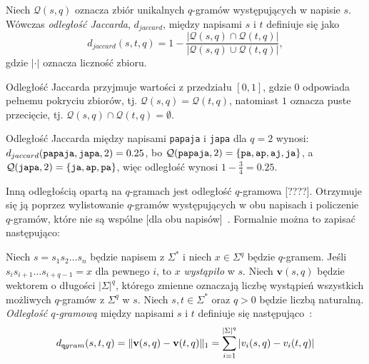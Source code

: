 \documentclass{praca1}
\DeclarePairedDelimiter{\norm}{\lVert}{\rVert}
\begin{document}
\begin{definition}
Niech $\mathcal{Q}(s,q)$ oznacza zbiór unikalnych $q$-gramów występujących w napisie $s$. Wówczas \emph{odległość Jaccarda}, $d_{jaccard}$, między napisami $s$ i $t$ definiuje się jako
\begin{equation*}
d_{jaccard}(s,t,q) = 1 - \frac{|\mathcal{Q}(s,q) \cap \mathcal{Q}(t,q)|}{|\mathcal{Q}(s,q) \cup \mathcal{Q}(t,q)|},
\end{equation*}
gdzie $|\cdot|$ oznacza liczność zbioru.
\end{definition} 

Odległość Jaccarda przyjmuje wartości z przedziału $[0,1]$, gdzie $0$ odpowiada pełnemu pokryciu zbiorów, tj. $\mathcal{Q}(s,q) = \mathcal{Q}(t,q)$, natomiast $1$ oznacza puste przecięcie, tj. $\mathcal{Q}(s,q) \cap \mathcal{Q}(t,q) = \emptyset$.

\begin{example}
Odległość Jaccarda między napisami \verb|papaja| i \verb|japa| dla $q = 2$ wynosi: $d_{jaccard}(\verb|papaja|, \verb|japa|, 2)  = 0.25$, bo $\mathcal{Q}(\verb|papaja|, 2) = \{\verb|pa|, \verb|ap|, \verb|aj|, \verb|ja|\}$, a $\mathcal{Q}(\verb|japa|, 2) = \{\verb|ja|, \verb|ap|, \verb|pa|\}$, więc odległość wynosi $1 - \frac{3}{4} = 0.25$.
\end{example}


Inną odległością opartą na $q$-gramach jest odległość $q$-gramowa [????]. Otrzymuje się ją poprzez wylistowanie $q$-gramów występujących w obu napisach i policzenie $q$-gramów, które nie są wspólne [dla obu napisów]~\cite{Loo2014:stringdist}. Formalnie można to zapisać następująco:

\begin{definition}
Niech $s = s_1 s_2 \ldots s_n$ będzie napisem z $\Sigma^*$ i niech $x \in \Sigma^q$ będzie $q$-gramem. Jeśli $s_i s_{i+1} \ldots s_{i+q-1} = x$ dla pewnego $i$, to $x$ \emph{wystąpiło} w $s$. Niech $\mathbf{v}(s,q)$ będzie wektorem o długości $|\Sigma|^q$, którego zmienne oznaczają liczbę wystąpień wszystkich możliwych $q$-gramów z $\Sigma^q$ w $s$. Niech $s, t \in \Sigma^*$ oraz $q>0$ będzie liczbą naturalną. \emph{Odległość $q$-gramową} między napisami $s$ i $t$ definiuje się następująco~\cite{Ukkonen1992:approxqgrams}:
\begin{equation}
\label{eq:009}
d_{\mathtt{q}gram}(s,t,q) = \norm{\mathbf{v}(s,q) - \mathbf{v}(t,q)}_1 = \sum\limits_{i = 1}^{|\Sigma|^q} |v_i(s,q) - v_i(t,q)|
\end{equation}
\end{definition} 
\end{document}
